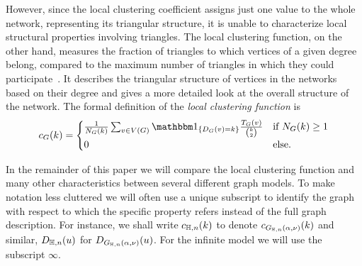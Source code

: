 However, since the local clustering coefficient assigns just one value to the whole network, representing its triangular structure, it is unable to characterize local structural properties involving triangles. 
The local clustering function, on the other hand, measures the fraction of triangles to which vertices of a given degree belong, compared to the maximum number of triangles in which they could participate~\cite{vazquez2002large,serrano2006clustering}. It describes the triangular structure of vertices in the networks based on their degree and gives a more detailed look at the overall structure of the network.
The formal definition of the \emph{local clustering function} is 
\begin{equation}\label{eq:def_local_clustering_general}
	c_{G}(k) = \begin{cases}
		\frac{1}{N_G(k)} \sum_{v \in V(G)}  \ind{D_G(v) = k} \frac{\T_G(v)}{\binom{k}{2}} &\mbox{if } N_G(k) \ge 1\\
		0 &\mbox{else.}
	\end{cases}
\end{equation} 


\begin{remark}\label{rmk:notation}
In the remainder of this paper we will compare the local clustering function and many other characteristics between several different graph models. To make notation less cluttered we will often use a unique subscript to identify the graph with respect to which the specific property refers instead of the full graph description. For instance, we shall write $c_{\mathbb{H},n}(k)$ to denote $c_{G_{\mathbb{H},n}(\alpha, \nu)}(k)$ and similar, $D_{\mathbb{H}, n}(u)$ for $D_{G_{\mathbb{H},n}(\alpha, \nu)}(u)$. For the infinite model we will use the subscript $\infty$.
\end{remark}


